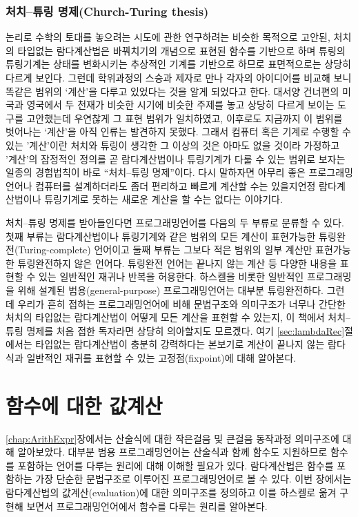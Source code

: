 \subsection{처치--튜링 명제(Church-Turing thesis)}
논리로 수학의 토대를 놓으려는 시도에 관한 연구하려는 비슷한 목적으로 고안된,
처치의 타입없는 람다계산법은 바꿔치기의 개념으로 표현된 함수를 기반으로 하며
튜링의 튜링기계는 상태를 변화시키는 추상적인 기계를 기반으로 하므로
표면적으로는 상당히 다르게 보인다. 그런데 학위과정의 스승과 제자로 만나
각자의 아이디어를 비교해 보니 똑같은 범위의 `계산'을 다루고 있었다는 것을
알게 되었다고 한다. 대서양 건너편의 미국과 영국에서 두 천재가 비슷한 시기에
비슷한 주제를 놓고 상당히 다르게 보이는 도구를 고안했는데 우연찮게 그 표현
범위가 일치하였고, 이후로도 지금까지 이 범위를 벗어나는 `계산'을 아직 인류는
발견하지 못했다. 그래서 컴퓨터 혹은 기계로 수행할 수 있는 '계산'이란
처치와 튜링이 생각한 그 이상의 것은 아마도 없을 것이라 가정하고 '계산'의
잠정적인 정의를 곧 람다계산법이나 튜링기계가 다룰 수 있는 범위로 보자는
일종의 경험법칙이 바로 ``처치--튜링 명제''이다.
다시 말하자면 아무리 좋은 프로그래밍언어나 컴퓨터를 설계하더라도 좀더 편리하고
빠르게 계산할 수는 있을지언정 람다계산법이나 튜링기계로 못하는 새로운 계산을
할 수는 없다는 이야기다.

처치--튜링 명제를 받아들인다면 프로그래밍언어를 다음의 두 부류로 분류할 수 있다.
첫째 부류는 람다계산법이나 튜링기계와 같은 범위의 모든 계산이 표현가능한 
튜링완전(Turing-complete) 언어이고 둘째 부류는 그보다 적은 범위의 일부 계산만
표현가능한 튜링완전하지 않은 언어다. 튜링완전 언어는 끝나지 않는 계산 등
다양한 내용을 표현할 수 있는 일반적인 재귀나 반복을 허용한다. 하스켈을 비롯한
일반적인 프로그래밍을 위해 설계된 범용(general-purpose) 프로그래밍언어는 대부분
튜링완전하다. 그런데 우리가 흔히 접하는 프로그래밍언어에 비해 문법구조와
의미구조가 너무나 간단한 처치의 타입없는 람다계산법이 어떻게 모든 계산을
표현할 수 있는지, 이 책에서 처치--튜링 명제를 처음 접한 독자라면 상당히
의아할지도 모르겠다. 여기 \ref{sec:lambdaRec}절에서는 타입없는 람다계산법이 충분히 강력하다는
본보기로 계산이 끝나지 않는 람다식과 일반적인 재귀를 표현할 수 있는
고정점(fixpoint)에 대해 알아본다.




\chapter{함수에 대한 값계산}
\label{chap:FunEval}
\ref{chap:ArithExpr}장에서는 산술식에 대한 작은걸음 및 큰걸음
동작과정 의미구조에 대해 알아보았다. 대부분 범용 프로그래밍언어는
산술식과 함께 함수도 지원하므로 함수를 포함하는 언어를
다루는 원리에 대해 이해할 필요가 있다. 람다계산법은 함수를 포함하는
가장 단순한 문법구조로 이루어진 프로그래밍언어로 볼 수 있다. 
이번 장에서는 람다계산법의 값계산(evaluation)에 대한 의미구조를 정의하고
이를 하스켈로 옮겨 구현해 보면서
프로그래밍언어에서 함수를 다루는 원리를 알아본다.
\newpage

